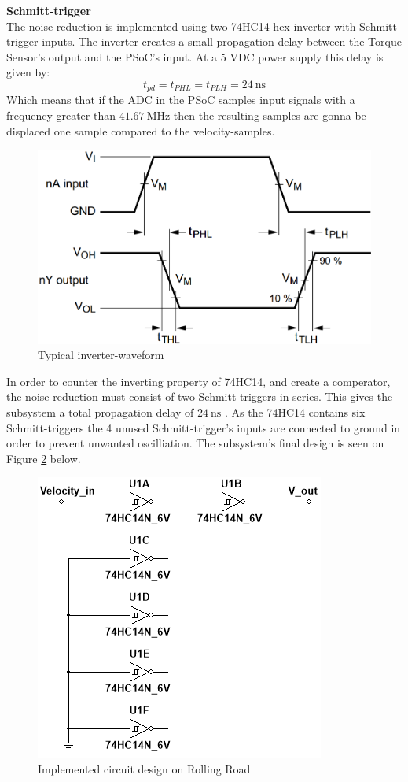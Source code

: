 \textbf{Schmitt-trigger}\\
The noise reduction is implemented using two 74HC14 hex inverter with Schmitt-trigger inputs\cite{74HC14}. The inverter creates a small propagation delay between the Torque Sensor's output and the PSoC's input. At a 5 VDC power supply this delay is given by:
\begin{equation}
	t_{pd} = t_{PHL} = t_{PLH} = \SI{24}{\nano \second}
\end{equation}
Which means that if the ADC in the PSoC samples input signals with a frequency greater than $\SI{41.67}{\mega \hertz}$ then the resulting samples are gonna be displaced one sample compared to the velocity-samples.

\begin{figure}[H]
	\centering
	\includegraphics[width=0.5\linewidth]{Hardware/Pictures/74HC14_waveform}
	\caption{Typical inverter-waveform}
	\label{fig:SchmittTrigger_waveform}
\end{figure}

In order to counter the inverting property of 74HC14, and create a comperator, the noise reduction  must consist of two Schmitt-triggers in series. This gives the subsystem a total propagation delay of $\SI{24}{\nano \second}$ . As the 74HC14 contains six Schmitt-triggers the 4 unused Schmitt-trigger's inputs are connected to ground in order to prevent unwanted oscilliation. The subsystem's final design is seen on Figure \ref{fig:SignalConverterVelocity} below.

\begin{figure}[H]
	\centering
	\includegraphics[width=0.5\linewidth]{Hardware/SignalConverter/VelocityDesign}
	\caption{Implemented circuit design on Rolling Road}
	\label{fig:SignalConverterVelocity}
\end{figure}

